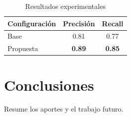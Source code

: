\documentclass[conference]{IEEEtran}
\begin{document}
\begin{table}[htbp]
  \caption{Resultados experimentales}
  \label{tab:resultados}
  \centering
  \begin{tabular}{lcc}
    \toprule
    Configuración & Precisión & Recall \\
    \midrule
    Base & 0.81 & 0.77 \\
    Propuesta & \textbf{0.89} & \textbf{0.85} \\
    \bottomrule
  \end{tabular}
\end{table}

\section{Conclusiones}
Resume los aportes y el trabajo futuro.



\end{document}

